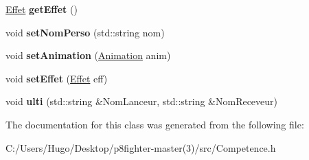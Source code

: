\begin{DoxyCompactItemize}
\hyperlink{class_effet}{Effet} {\bfseries get\+Effet} ()
\item 
\mbox{\label{class_competence_a4bacfd2e376f9c16d9ccdaba4277694a}} 
void {\bfseries set\+Nom\+Perso} (std\+::string nom)
\item 
\mbox{\label{class_competence_a90557432d48e3aa218ad0cbec93468dd}} 
void {\bfseries set\+Animation} (\hyperlink{class_animation}{Animation} anim)
\item 
\mbox{\label{class_competence_acba7e5aa5d50090d4c806df27fbdffef}} 
void {\bfseries set\+Effet} (\hyperlink{class_effet}{Effet} eff)
\item 
\mbox{\label{class_competence_ae935043ec1c5f31d2829a008895d77a5}} 
void {\bfseries ulti} (std\+::string \&Nom\+Lanceur, std\+::string \&Nom\+Receveur)
\end{DoxyCompactItemize}


The documentation for this class was generated from the following file\+:\begin{DoxyCompactItemize}
\item 
C\+:/\+Users/\+Hugo/\+Desktop/p8fighter-\/master(3)/src/Competence.\+h\end{DoxyCompactItemize}
